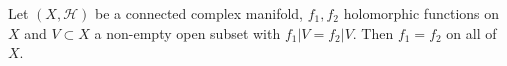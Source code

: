 Let $(X, \mathcal{H})$ be a connected complex manifold, $f_1, f_2$ holomorphic functions on $X$ and $V \subset X$ a non-empty open subset with $f_1|V = f_2|V$. Then $f_1 = f_2$ on all of $X$.
